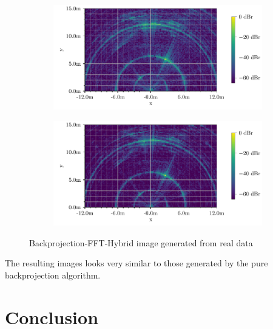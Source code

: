 \begin{figure}[t]
    \centering
    \begin{subfigure}{0.8\textwidth}
        \includegraphics[width=\textwidth]{../figures/testimg_uncalibrated_hybrid.pdf}
    \end{subfigure}
    \begin{subfigure}{0.8\textwidth}
        \includegraphics[width=\textwidth]{../figures/testimg_calibrated_hybrid.pdf}
    \end{subfigure}
    \caption{Backprojection-FFT-Hybrid image generated from real data}
    \label{fig:hybrid_testimg}
\end{figure}
The resulting images looks very similar to those generated by the pure backprojection algorithm.

\section{Conclusion}




